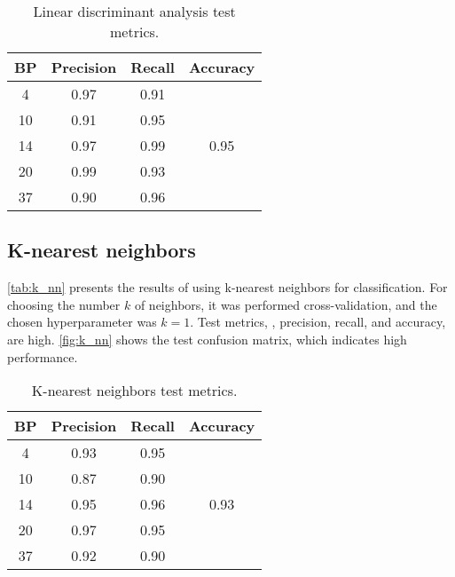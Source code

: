         \begin{table}[H]
                \centering
                \caption{Linear discriminant analysis test metrics.}
                \label{tab:lda}
                \begin{tabular}{c|cc|c}
                BP & Precision & Recall & Accuracy              \\ \hline
                4  & 0.97      & 0.91   & \multirow{5}{*}{0.95} \\
                10 & 0.91      & 0.95   &                       \\
                14 & 0.97      & 0.99   &                       \\
                20 & 0.99      & 0.93   &                       \\
                37 & 0.90      & 0.96   &                      
                \end{tabular}
        \end{table}

    \subsection{K-nearest neighbors}

        \autoref{tab:k_nn} presents the results of using k-nearest neighbors for classification. For choosing the number $k$ of neighbors, it was performed cross-validation, and the chosen hyperparameter was $k = 1$. Test metrics, \ie, precision, recall, and accuracy, are high. \autoref{fig:k_nn} shows the test confusion matrix, which indicates high performance.
        
        \begin{table}[H]
                \centering
                \caption{K-nearest neighbors test metrics.}
                \label{tab:k_nn}
                \begin{tabular}{c|cc|c}
                BP & Precision & Recall & Accuracy              \\ \hline
                4  & 0.93      & 0.95   & \multirow{5}{*}{0.93} \\
                10 & 0.87      & 0.90   &                       \\
                14 & 0.95      & 0.96   &                       \\
                20 & 0.97      & 0.95   &                       \\
                37 & 0.92      & 0.90   &                      
                \end{tabular}
        \end{table}

